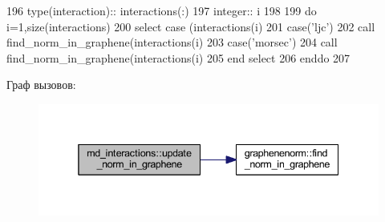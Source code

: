 \begin{DoxyCode}
196     \textcolor{keywordtype}{type}(interaction):: interactions(:)
197     \textcolor{keywordtype}{integer}:: i
198     
199     \textcolor{keywordflow}{do} i=1,\textcolor{keyword}{size}(interactions)
200         \textcolor{keywordflow}{select case} (interactions(i)%
201         \textcolor{keywordflow}{case}(\textcolor{stringliteral}{'ljc'})
202             \textcolor{keyword}{call }find\_norm\_in\_graphene(interactions(i)%
203         \textcolor{keywordflow}{case}(\textcolor{stringliteral}{'morsec'})
204             \textcolor{keyword}{call }find\_norm\_in\_graphene(interactions(i)%
205 \textcolor{keywordflow}{        end select}
206 \textcolor{keywordflow}{    enddo}
207 
\end{DoxyCode}
Граф вызовов\+:\nopagebreak
\begin{figure}[H]
\begin{center}
\leavevmode
\includegraphics[width=338pt]{namespacemd__interactions_a0f767aead142dc9f1f692172a21a590a_cgraph}
\end{center}
\end{figure}
